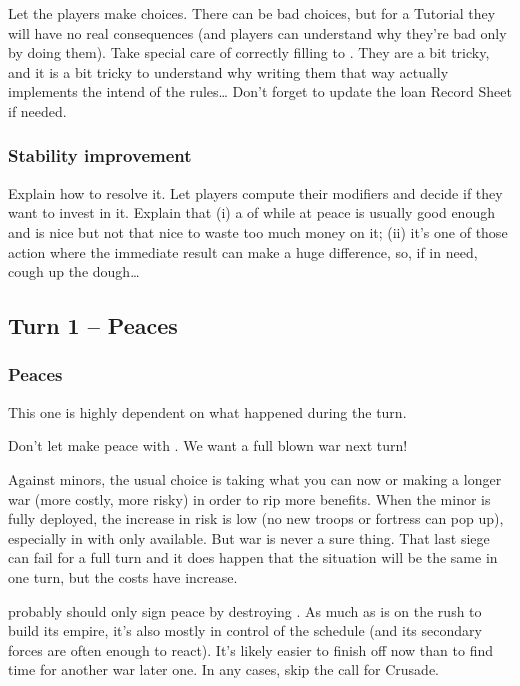 \aparag Let the players make choices. There can be bad choices, but for a
Tutorial they will have no real consequences (and players can understand why
they're bad only by doing them).
\bparag Take special care of correctly filling  to . They are a bit tricky, and it is a
bit tricky to understand why writing them that way actually implements the
intend of the rules\ldots
\bparag Don't forget to update the loan Record Sheet if needed.

\subsubsection{Stability improvement}
\aparag Explain how to resolve it.
\bparag Let players compute their modifiers and decide if they want to invest
in it.
\bparag Explain that (i) a \STAB of  while at peace is usually good
enough and  is nice but not that nice to waste too much money on it;
(ii) it's one of those action where the immediate result can make a huge
difference, so, if in need, cough up the dough\ldots

\subsection{Turn 1 -- Peaces}
\subsubsection{Peaces}
\aparag This one is highly dependent on what happened during the turn.

\aparag Don't let \FRA make peace with \paysNaples. We want a full blown war
next turn!

\aparag Against minors, the usual choice is taking what you can now or making
a longer war (more costly, more risky) in order to rip more benefits.
\bparag When the minor is fully deployed, the increase in risk is low (no new
troops or fortress can pop up), especially in \TMED with only 
available.
\bparag But war is never a sure thing. That last siege can fail for a full
turn and it does happen that the situation will be the same in one turn, but
the costs have increase.

\aparag \TUR probably should only sign peace by destroying \paysGeorgie.
\bparag As much as \TUR is on the rush to build its empire, it's also mostly
in control of the schedule (and its secondary forces are often enough to
react). It's likely easier to finish off \paysGeorgie now than to find time
for another war later one.
\bparag In any cases, skip the call for Crusade.

